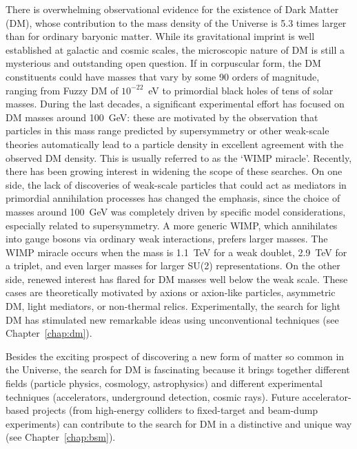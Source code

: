 \documentclass[../report.tex]{subfiles}
\begin{document}
\smallskip
\noindent
There is overwhelming observational evidence for the existence of Dark Matter (DM), whose contribution to the mass density of the Universe is 5.3 times larger than for ordinary baryonic matter. While its gravitational imprint is well established at galactic and cosmic scales, the microscopic nature of DM is still a mysterious and outstanding open question. If in corpuscular form, the DM constituents could have masses that vary by some 90 orders of magnitude, ranging from Fuzzy DM of $10^{-22}$~eV to primordial black holes of tens of solar masses. During the last decades, a significant experimental effort has focused on DM masses around 100~GeV:  these are motivated by the  observation that particles in this mass range predicted by supersymmetry or other weak-scale theories automatically lead to a particle density in excellent agreement with the observed DM density. This is usually referred to as the `WIMP miracle'. Recently, there has been growing interest in widening the scope of these searches. On one side, the lack of discoveries of weak-scale particles that could act as mediators in primordial annihilation processes has changed the emphasis, since the choice of masses around 100~GeV was completely driven by specific model considerations, especially related to supersymmetry. A more generic WIMP, which annihilates into gauge bosons via ordinary weak interactions, prefers larger masses. The WIMP miracle occurs when the mass is 1.1~TeV for a weak doublet, 2.9~TeV for a triplet, and even larger masses for larger SU(2) representations. On the other side, renewed interest has flared for DM masses well below the weak scale. These cases are theoretically motivated by axions or axion-like particles, asymmetric DM, light mediators, or non-thermal relics. Experimentally, the search for light DM has stimulated new remarkable ideas using unconventional techniques (see Chapter~\ref{chap:dm}).

Besides the exciting prospect of discovering a new form of matter so common in the Universe, the search for DM is fascinating  because it brings together different fields (particle physics, cosmology, astrophysics) and different experimental techniques (accelerators, underground detection, cosmic rays). Future accelerator-based projects (from high-energy colliders to fixed-target and beam-dump experiments) can contribute to the search for DM in a distinctive and unique way (see Chapter~\ref{chap:bsm}).

\medskip
{}
\end{document}
